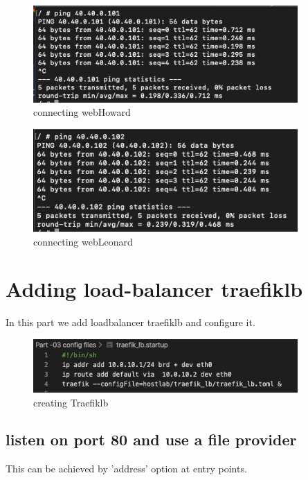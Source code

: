 \begin{figure}[H]
\centering
  \includegraphics[width=0.9\textwidth]{Images/connecting web-howard.png}
  \caption{connecting web\textunderscore Howard}
  \label{fig:3.7}
\end{figure}

\begin{figure}[H]
\centering
  \includegraphics[width=0.9\textwidth]{Images/connecting web-lenard .png}
  \caption{connecting web\textunderscore Leonard}
  \label{fig:3.8}
\end{figure}



\section{Adding load-balancer traefik\textunderscore lb }
In this part we add loadbalancer traefik\textunderscore lb and configure it.

\begin{figure}[H]
\centering
  \includegraphics[width=0.9\textwidth]{Images/Traefik-lb start up.png}
  \caption{creating Traefik\textunderscore lb}
  \label{fig:3.9}
\end{figure}

\subsection{listen on port 80 and use a file provider}
This can be achieved by 'address' option at entry points.

